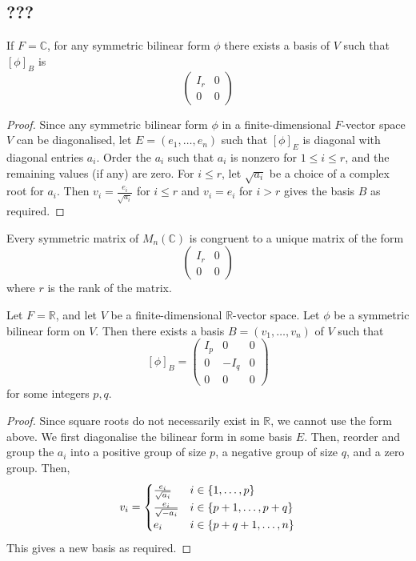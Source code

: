 \subsection{???}
\begin{corollary}
	If \( F = \mathbb C \), for any symmetric bilinear form \( \phi \) there exists a basis of \( V \) such that \( [\phi]_B \) is
	\[
		\begin{pmatrix}
			I_r & 0 \\
			0   & 0
		\end{pmatrix}
	\]
\end{corollary}
\begin{proof}
	Since any symmetric bilinear form \( \phi \) in a finite-dimensional \( F \)-vector space \( V \) can be diagonalised, let \( E = (e_1, \dots, e_n) \) such that \( [\phi]_E \) is diagonal with diagonal entries \( a_i \).
	Order the \( a_i \) such that \( a_i \) is nonzero for \( 1 \leq i \leq r \), and the remaining values (if any) are zero.
	For \( i \leq r \), let \( \sqrt{a_i} \) be a choice of a complex root for \( a_i \).
	Then \( v_i = \frac{e_i}{\sqrt{a_i}} \) for \( i \leq r \) and \( v_i = e_i \) for \( i > r \) gives the basis \( B \) as required.
\end{proof}
\begin{corollary}
	Every symmetric matrix of \( M_n(\mathbb C) \) is congruent to a unique matrix of the form
	\[
		\begin{pmatrix}
			I_r & 0 \\
			0   & 0
		\end{pmatrix}
	\]
	where \( r \) is the rank of the matrix.
\end{corollary}
\begin{corollary}
	Let \( F = \mathbb R \), and let \( V \) be a finite-dimensional \( \mathbb R \)-vector space.
	Let \( \phi \) be a symmetric bilinear form on \( V \).
	Then there exists a basis \( B = (v_1, \dots, v_n) \) of \( V \) such that
	\[
		[\phi]_B = \begin{pmatrix}
			I_p & 0    & 0 \\
			0   & -I_q & 0 \\
			0   & 0    & 0
		\end{pmatrix}
	\]
	for some integers \( p, q \).
\end{corollary}
\begin{proof}
	Since square roots do not necessarily exist in \( \mathbb R \), we cannot use the form above.
	We first diagonalise the bilinear form in some basis \( E \).
	Then, reorder and group the \( a_i \) into a positive group of size \( p \), a negative group of size \( q \), and a zero group.
	Then,
	\[
		v_i = \begin{cases}
			\frac{e_i}{\sqrt{a_i}}  & i \in \qty{1, \dots, p}     \\
			\frac{e_i}{\sqrt{-a_i}} & i \in \qty{p+1, \dots, p+q} \\
			e_i                     & i \in \qty{p+q+1, \dots, n}
		\end{cases}
	\]
	This gives a new basis as required.
\end{proof}

